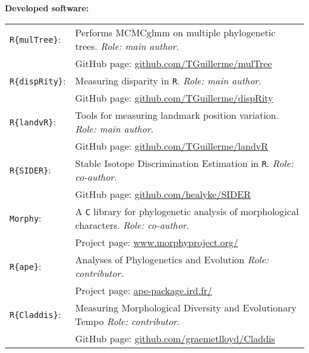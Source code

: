 \documentclass[10pt,a4paper]{article}
\begin{document}
{\raggedright\textbf{Developed software:}\\[1.5ex]
\begin{tabular}{ll}
\texttt{R\{mulTree\}}: & Performs MCMCglmm on multiple phylogenetic trees. \textit{Role: main author}.\\
                       & GitHub page: \href{https://github.com/TGuillerme/mulTree}{github.com/TGuillerme/mulTree} \\
\texttt{R\{dispRity\}}: & Measuring disparity in \texttt{R}. \textit{Role: main author}.\\
                       & GitHub page: \href{https://github.com/TGuillerme/dispRity}{github.com/TGuillerme/dispRity}\\
\texttt{R\{landvR\}}: & Tools for measuring landmark position variation. \textit{Role: main author}. \\
                       & GitHub page: \href{https://github.com/TGuillerme/landvR}{github.com/TGuillerme/landvR} \\
\texttt{R\{SIDER\}}: & Stable Isotope Discrimination Estimation in \texttt{R}. \textit{Role: co-author}. \\
                       & GitHub page: \href{https://github.com/healyke/SIDER}{github.com/healyke/SIDER} \\
\texttt{Morphy}: & A \texttt{C} library for phylogenetic analysis of morphological characters. \textit{Role: co-author}. \\
                       & Project page: \href{http://www.morphyproject.org/}{www.morphyproject.org/} \\
\texttt{R\{ape\}}: & Analyses of Phylogenetics and Evolution \textit{Role: contributor}. \\
                       & Project page: \href{http://ape-package.ird.fr/}{ape-package.ird.fr/} \\
\texttt{R\{Claddis\}}: & Measuring Morphological Diversity and Evolutionary Tempo \textit{Role: contributor}. \\
                       & GitHub page: \href{https://github.com/graemetlloyd/Claddis}{github.com/graemetlloyd/Claddis} \\                       
\end{tabular} \\


\bigskip
}
\end{document}
